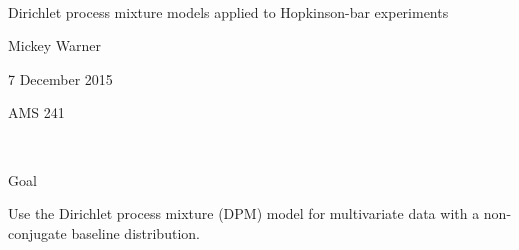 \documentclass[serif, 12pt, t]{beamer}
\renewcommand{\frametitle}[1]{\vspace{0.14cm}\hspace{-0.70cm}\textcolor{col2}{%
    \Large{#1}}\vspace{0.15cm}\newline}
\begin{document}
\ \\ [-0.5in]
\vfill
\bigskip
\bigskip
\bigskip
\bigskip
\bigskip

\begin{Large}
Dirichlet process mixture models applied to Hopkinson-bar experiments
\end{Large}
\vfill

Mickey Warner
\vfill

7 December 2015
\smallskip

AMS 241

\bigskip
\bigskip
\vfill
\ \\ [-0.5in]


\begin{frame}
\frametitle{Goal}

Use the Dirichlet process mixture (DPM) model for multivariate data with a non-conjugate baseline distribution.

\end{frame}
\end{document}
